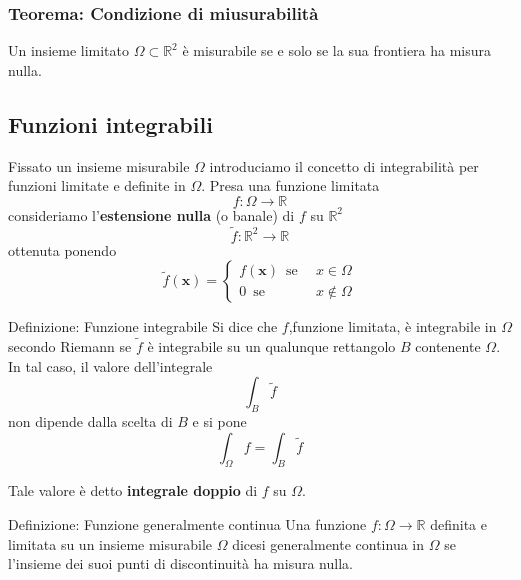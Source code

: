 \documentclass[x11names]{article}
\begin{document}
	\begin{center}
		\colorbox{myred}{\begin{minipage}{5.75in}
				\begin{redes}{}
					\subsubsection{Teorema: Condizione di miusurabilità}
					Un insieme limitato \(\Omega \subset \mathbb{R}^2\) è misurabile se e solo se la sua frontiera ha misura nulla.
				\end{redes}
		\end{minipage}}
	\end{center}
	
	\subsection{Funzioni integrabili}
	Fissato un insieme misurabile \(\Omega\) introduciamo il concetto di integrabilità per funzioni limitate e definite in \(\Omega\). Presa una funzione limitata
	\[ 
	f : \Omega \to \mathbb{R}
	\]
	consideriamo l'\textbf{estensione nulla} (o banale) di \(f\) su \(\mathbb{R}^2\)
	\[ 
	\tilde{f} : \mathbb{R}^2 \to \mathbb{R}
	\]
	ottenuta ponendo
	\[ 
	\tilde{f}(\boldsymbol{x}) = \left\{\begin{array}{lc}
		f(\boldsymbol{x}) \;\  \text{se}  	&\;\  x \in \Omega \\
		0 \;\ \text{se}  					& \;\ x \notin \Omega 
	\end{array}\right.
	\]
	\begin{center}
		\colorbox{myblue}{\begin{minipage}{5.75in}
				\begin{blues}{Definizione: Funzione integrabile}
					Si dice che \(f\),funzione limitata, è integrabile in \(\Omega\) secondo Riemann se \(\tilde{f}\) è integrabile su un qualunque rettangolo \(B\) contenente \(\Omega\). In tal caso, il valore dell'integrale
					\[ 
					\int_B \tilde{f}
					\]
					non dipende dalla scelta di \(B\) e si pone
					\[ 
					\int_{\Omega} f = \int_B \tilde{f}
					\]
					
					Tale valore è detto \textbf{integrale doppio} di \(f\) su \(\Omega\). 
				\end{blues}
		\end{minipage}}      
	\end{center}
	\begin{center}
		\colorbox{myblue}{\begin{minipage}{5.75in}
				\begin{blues}{Definizione: Funzione generalmente continua}
					Una funzione \(f:\Omega \to \mathbb{R}\) definita e limitata su un insieme misurabile \(\Omega\) dicesi generalmente continua in \(\Omega\) se l'insieme dei suoi punti di discontinuità ha misura nulla.
				\end{blues}
		\end{minipage}}      
	\end{center}
\end{document}
